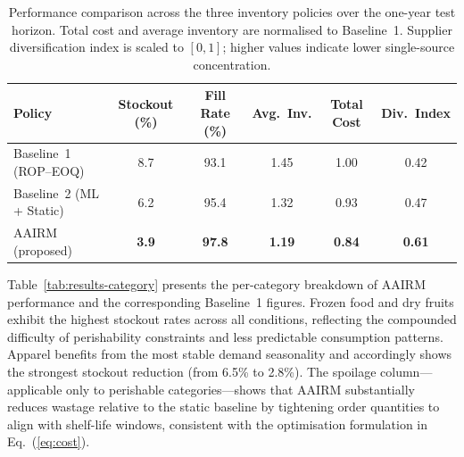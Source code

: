 \documentclass[utf8]{FrontiersinHarvard}
\begin{document}
	\begin{table}[htbp]
		\centering
		\caption{Performance comparison across the three inventory policies
			over the one-year test horizon.  Total cost and average inventory
			are normalised to Baseline~1.  Supplier diversification index is
			scaled to $[0,1]$; higher values indicate lower single-source
			concentration.}
		\label{tab:results-overview}
		\begin{tabular}{lccccc}
			\toprule
			\textbf{Policy}
			& \textbf{Stockout (\%)}
			& \textbf{Fill Rate (\%)}
			& \textbf{Avg.\ Inv.}
			& \textbf{Total Cost}
			& \textbf{Div.\ Index} \\
			\midrule
			Baseline~1 (ROP--EOQ)          & 8.7 & 93.1 & 1.45 & 1.00 & 0.42 \\
			Baseline~2 (ML + Static)       & 6.2 & 95.4 & 1.32 & 0.93 & 0.47 \\
			AAIRM (proposed)               & \textbf{3.9} & \textbf{97.8}
			                               & \textbf{1.19} & \textbf{0.84}
			                               & \textbf{0.61} \\
			\bottomrule
		\end{tabular}
	\end{table}

	Table~\ref{tab:results-category} presents the per-category breakdown of
	AAIRM performance and the corresponding Baseline~1 figures.  Frozen food
	and dry fruits exhibit the highest stockout rates across all conditions,
	reflecting the compounded difficulty of perishability constraints and
	less predictable consumption patterns.  Apparel benefits from the most
	stable demand seasonality and accordingly shows the strongest stockout
	reduction (from 6.5\% to 2.8\%).  The spoilage column---applicable only
	to perishable categories---shows that AAIRM substantially reduces wastage
	relative to the static baseline by tightening order quantities to align
	with shelf-life windows, consistent with the optimisation formulation in
	Eq.~(\ref{eq:cost}).
\end{document}
